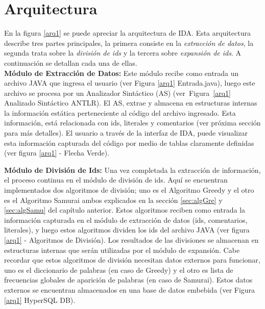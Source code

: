 \section{Arquitectura}


En la figura \ref{arq1} se puede apreciar la arquitectura de IDA. Esta arquitectura describe tres partes principales, la primera consiste en la \textit{extracción de datos}, la segunda trata sobre la \textit{división de ids} y la tercera sobre \textit{expansión de ids}. A continuación se detallan cada una de ellas.\\

\textbf{Módulo de Extracción de Datos:} Este módulo recibe como entrada un archivo JAVA que ingresa el usuario (ver Figura \ref{arq1} Entrada.java), luego este archivo se procesa por un Analizador Sintáctico (AS) (\mbox{ver Figura \ref{arq1}} Analizado Sintáctico ANTLR). El AS, extrae y almacena en estructuras internas la información estática perteneciente al código del archivo ingresado. Esta información, está relacionada con ids, literales y comentarios (ver próxima sección para más detalles). El usuario a través de la interfaz de IDA, puede visualizar esta información capturada del código por medio de tablas claramente definidas (ver figura \ref{arq1} - Flecha Verde).

\textbf{Módulo de División de Ids:} Una vez completada la extracción de información, el proceso continua en el módulo de división de ids. Aquí se encuentran implementados dos algoritmos de división; uno es el Algoritmo Greedy y el otro es el Algoritmo Samurai ambos explicados en la sección \ref{sec:algGre} y \ref{sec:algSamu} del capítulo anterior. Estos algoritmos reciben como entrada la información capturada en el módulo de extracción de datos (ids, comentarios, literales), y luego estos algoritmos dividen los ids del archivo JAVA (ver figura \ref{arq1} - Algoritmos de División). Los resultados de las divisiones se almacenan en estructuras internas que serán utilizadas por el módulo de expansión. Cabe recordar que estos algoritmos de división necesitan datos externos para funcionar, uno es el diccionario de palabras (en caso de Greedy) y el otro es lista de frecuencias globales de aparición de palabras (en caso de Samurai). Estos datos externos se encuentran almacenados en una base de datos embebida (ver Figura \ref{arq1} HyperSQL DB).

